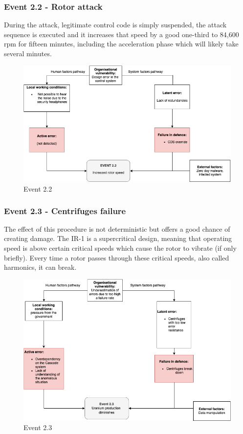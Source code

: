 \documentclass[12pt]{article}
\begin{document}
    \subsubsection{Event 2.2 - Rotor attack}
    During the attack, legitimate control code is simply suspended, the attack sequence is executed and it increases that speed by a good one-third to 84,600 rpm for fifteen minutes, including the acceleration phase which will likely take several minutes.
    
        \begin{figure}[H]
        \centering
        \includegraphics[height=0.6\textwidth]{event22.png}
        \caption{Event 2.2}
        \label{fig:event22}
        \end{figure}
        
    \subsubsection{Event 2.3 - Centrifuges failure}
    The effect of this procedure is not deterministic but offers a good chance of creating damage. The IR-1 is a supercritical design, meaning that operating speed is above certain critical speeds which cause the rotor to vibrate (if only briefly). Every time a rotor passes through these critical speeds, also called harmonics, it can break. 
    
        \begin{figure}[H]
        \centering
        \includegraphics[height=0.6\textwidth]{event23.png}
        \caption{Event 2.3}
        \label{fig:event23}
        \end{figure}
        
\end{document}
